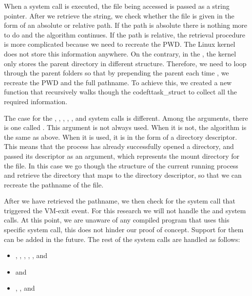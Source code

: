 \par When a system call is executed, the file being accessed is passed as a string pointer. After we retrieve the string, we check whether the file is given in the form of an absolute or relative path. If the path is absolute there is nothing more to do and the algorithm continues. If the path is relative, the retrieval procedure is more complicated because we need to recreate the \ac{PWD}. The Linux kernel does not store this information anywhere. On the contrary, in the , the kernel only stores the parent directory in different structure. Therefore, we need to loop through the parent folders so that by prepending the parent each time , we recreate the \ac{PWD} and the full pathname. To achieve this, we created a new function that recursively walks though the codeft{task\_struct} to collect all the required information. 

\par The case for the , , , , , and  system calls is different. Among the arguments, there is one called . This argument is not always used. When it is not, the algorithm is the same as above. When it is used, it is in the form of a directory descriptor. This means that the process has already successfully opened a directory, and passed its descriptor as an argument, which represents the mount directory for the file. In this case we go though the  structure of the current running process and retrieve the directory that maps to the directory descriptor, so that we can recreate the pathname of the file.

\par After we have retrieved the pathname, we then check for the system call that triggered the VM-exit event. For this research we will not handle the  and  system calls. At this point, we are unaware of any compiled program that uses this specific system call, this does not hinder our proof of concept. Support for them can be added in the future. The rest of the system calls are handled as follows: 


\begin{itemize}
	\item {}, , , , , and 
	\item {} and 
	\item {}, , and 
\end{itemize}

